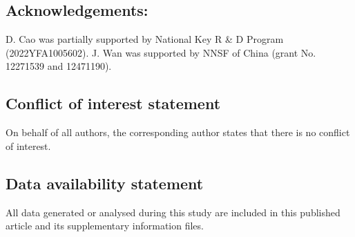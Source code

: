 \documentclass[12pt,reqno]{amsart}
\numberwithin{equation}{section}
\theoremstyle{definition}
\theoremstyle{remark}
\begin{document}
\fi







\subsection*{Acknowledgements:}

\par
D. Cao was partially supported by National Key R \& D
Program (2022YFA1005602). J. Wan was supported by NNSF of China (grant No. 12271539 and 12471190).


\subsection*{Conflict of interest statement} On behalf of all authors, the corresponding author states that there is no conflict of interest.

\subsection*{Data availability statement} All data generated or analysed during this study are included in this published article  and its supplementary information files.
\end{document}
